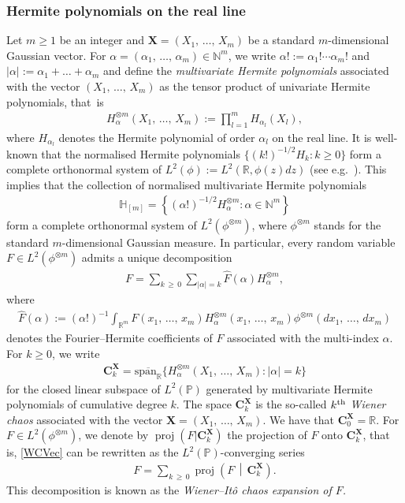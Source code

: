 \documentclass[10pt]{amsart}
\theoremstyle{definition}\newtheorem{defi}[theo]{Definition}\newtheorem{rema}[theo]{Remark}\newtheorem{exam}[theo]{Example}\newtheorem{exem}[theo]{Example}\newtheorem{nota}[theo]{Notation}
\DeclareMathOperator{\proj}{proj}
\newcommand{\spanl}{\mathrm{span}}
\newcommand{\bfX}{\mathbf{X}}
\newcommand{\bfC}{\mathbf{C}}
\newcommand{\R}{\mathbb{R}}
\newcommand{\N}{\mathbb{N}}
\newcommand{\bbH}{\mathbb{H}}
\newcommand{\Prob}{\mathbb{P}}
\begin{document}
\subsubsection{Hermite polynomials on the real line}
Let $m\geq 1$ be an integer and $\bfX=(X_1,\,\ldots,\,X_m)$ be a standard $m$-dimensional Gaussian vector. For $\alpha=(\alpha_1,\,\ldots,\,\alpha_m) \in \N^m$, we write $\alpha!:= \alpha_1!\cdots \alpha_m!$ and $|\alpha|:= \alpha_1+\ldots + \alpha_m$ and define the \emph{multivariate Hermite polynomials} associated with the vector $(X_1,\,\ldots,\,X_m)$ as the tensor product of univariate Hermite polynomials, that~is
\begin{gather*}
H^{\otimes m}_{\alpha}(X_1,\,\ldots,\,X_m):= \prod_{l=1}^{m} H_{{\alpha}_l}(X_l),
\end{gather*}
where $H_{\alpha_l}$ denotes the Hermite polynomial of order $\alpha_l$ on the real line. It is well-known that the normalised Hermite polynomials $\{(k!)^{-1/2}H_k: k \geq 0\}$ form a complete orthonormal system of $L^2(\phi):=L^2(\R,\phi(z)dz)$ (see e.g.~\cite{NP12}). This implies that the collection of normalised multivariate Hermite polynomials
\begin{gather}\label{Hm}
\bbH_{[m]}=\left\{ (\alpha!)^{-1/2} H^{\otimes m}_{\alpha} : \alpha \in \N^m \right\}
\end{gather}
form a complete orthonormal system of $L^2(\phi^{\otimes m})$, where $\phi^{\otimes m}$ stands for the standard $m$-dimensional Gaussian measure. In particular, every random variable $F \in L^2(\phi^{\otimes m})$ admits a unique decomposition
\begin{gather}\label{WCVec}
F = \sum_{k\,\geq\,0} \sum_{|\alpha|=k} \widehat{F}(\alpha) H^{\otimes m}_{\alpha},
\end{gather}
where
\begin{gather}\label{CoeffVec}
\widehat{F}(\alpha) := (\alpha!)^{-1} \int_{\R^m} F(x_1,\,\ldots,\,x_m) H^{\otimes m}_{\alpha}(x_1,\,\ldots,\,x_m) \phi^{\otimes m}(dx_1,\,\ldots,\,dx_m)
\end{gather}
denotes the Fourier--Hermite coefficients of $F$ associated with the multi-index $\alpha$. For $k\geq0$, we write
\begin{gather}\label{Ck}
\bfC_k^{\bfX} = \overline{\spanl_{\R}}\{ H_{\alpha}^{\otimes m}(X_1,\,\ldots,\,X_m): |\alpha|=k\}
\end{gather}
for the closed linear subspace of $L^2(\Prob)$ generated by multivariate Hermite polynomials of cumulative degree $k$. The space $\bfC_k^{\bfX}$ is the so-called \emph{$k^{\rm th}$ Wiener chaos} associated with the vector $\bfX=(X_1,\,\ldots,\,X_m)$. We have that $\bfC_0^{\bfX}=\R$. For $F \in L^2(\phi^{\otimes m})$, we denote by $\proj(F|\bfC_k^{\bfX})$ the projection of $F$ onto $\bfC_k^{\bfX}$, that is, \eqref{WCVec} can be rewritten as the $L^2(\Prob)$-converging series
\begin{gather*}
F = \sum_{k\,\geq\,0} \proj\left(F\,\middle|\, \bfC_k^{\bfX}\right).
\end{gather*}
This decomposition is known as the \emph{Wiener--Itô chaos expansion of $F$.}
\end{document}
